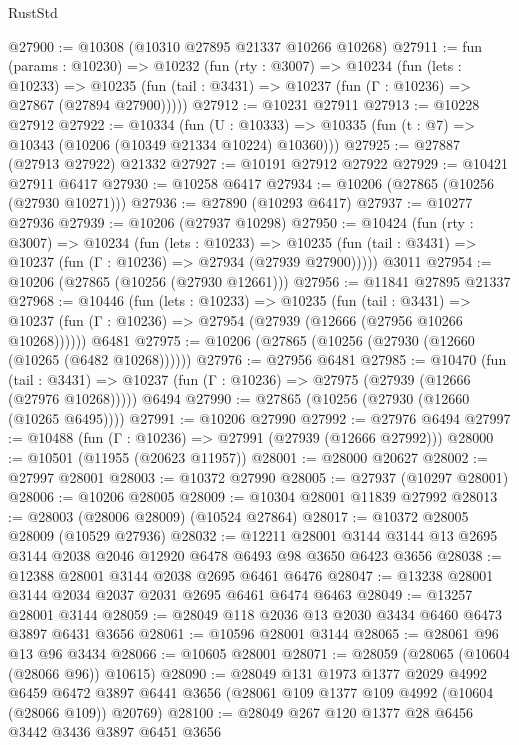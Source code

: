 \begin{lexlean}{RustStd}
\begin{coremodule}
@27900 := @10308 (@10310 @27895 @21337 @10266 @10268)
@27911 := fun (params : @10230) =>
  @10232
    (fun (rty : @3007) =>
    @10234
      (fun (lets : @10233) =>
      @10235 (fun (tail : @3431) => @10237 (fun (Γ : @10236) => @27867 (@27894 @27900)))))
@27912 := @10231 @27911
@27913 := @10228 @27912
@27922 := @10334
    (fun (U : @10333) => @10335 (fun (t : @7) => @10343 (@10206 (@10349 @21334 @10224) @10360)))
@27925 := @27887 (@27913 @27922) @21332
@27927 := @10191 @27912 @27922
@27929 := @10421 @27911 @6417
@27930 := @10258 @6417
@27934 := @10206 (@27865 (@10256 (@27930 @10271)))
@27936 := @27890 (@10293 @6417)
@27937 := @10277 @27936
@27939 := @10206 (@27937 @10298)
@27950 := @10424
    (fun (rty : @3007) =>
    @10234
      (fun (lets : @10233) =>
      @10235 (fun (tail : @3431) => @10237 (fun (Γ : @10236) => @27934 (@27939 @27900)))))
    @3011
@27954 := @10206 (@27865 (@10256 (@27930 @12661)))
@27956 := @11841 @27895 @21337
@27968 := @10446
    (fun (lets : @10233) =>
    @10235
      (fun (tail : @3431) =>
      @10237 (fun (Γ : @10236) => @27954 (@27939 (@12666 (@27956 @10266 @10268))))))
    @6481
@27975 := @10206 (@27865 (@10256 (@27930 (@12660 (@10265 (@6482 @10268))))))
@27976 := @27956 @6481
@27985 := @10470
    (fun (tail : @3431) => @10237 (fun (Γ : @10236) => @27975 (@27939 (@12666 (@27976 @10268)))))
    @6494
@27990 := @27865 (@10256 (@27930 (@12660 (@10265 @6495))))
@27991 := @10206 @27990
@27992 := @27976 @6494
@27997 := @10488 (fun (Γ : @10236) => @27991 (@27939 (@12666 @27992)))
@28000 := @10501 (@11955 (@20623 @11957))
@28001 := @28000 @20627
@28002 := @27997 @28001
@28003 := @10372 @27990
@28005 := @27937 (@10297 @28001)
@28006 := @10206 @28005
@28009 := @10304 @28001 @11839 @27992
@28013 := @28003 (@28006 @28009) (@10524 @27864)
@28017 := @10372 @28005 @28009 (@10529 @27936)
@28032 := @12211
    @28001
    @3144
    @3144
    @13
    @2695
    @3144
    @2038
    @2046
    @12920
    @6478
    @6493
    @98
    @3650
    @6423
    @3656
@28038 := @12388 @28001 @3144 @2038 @2695 @6461 @6476
@28047 := @13238 @28001 @3144 @2034 @2037 @2031 @2695 @6461 @6474 @6463
@28049 := @13257 @28001 @3144
@28059 := @28049 @118 @2036 @13 @2030 @3434 @6460 @6473 @3897 @6431 @3656
@28061 := @10596 @28001 @3144
@28065 := @28061 @96 @13 @96 @3434
@28066 := @10605 @28001
@28071 := @28059 (@28065 (@10604 (@28066 @96)) @10615)
@28090 := @28049
    @131
    @1973
    @1377
    @2029
    @4992
    @6459
    @6472
    @3897
    @6441
    @3656
    (@28061 @109 @1377 @109 @4992 (@10604 (@28066 @109)) @20769)
@28100 := @28049 @267 @120 @1377 @28 @6456 @3442 @3436 @3897 @6451 @3656

\end{coremodule}
\end{lexlean}
